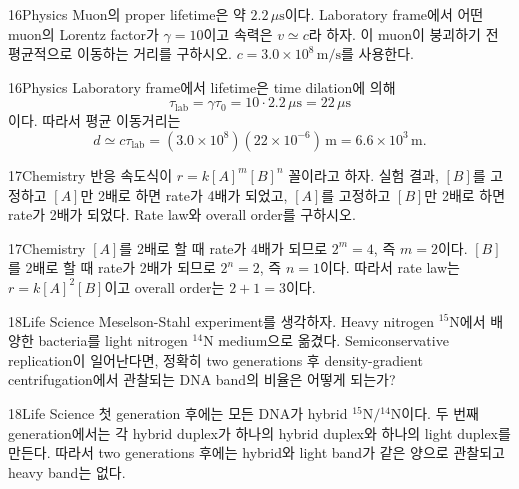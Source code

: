 \documentclass[12pt,aspectratio=169]{beamer}
\begin{document}
\begin{problemframe}{16}{Physics}
Muon의 proper lifetime은 약 $2.2\,\mu\mathrm{s}$이다. Laboratory frame에서 어떤 muon의 Lorentz factor가 $\gamma=10$이고 속력은 $v\simeq c$라 하자. 이 muon이 붕괴하기 전 평균적으로 이동하는 거리를 구하시오. $c=3.0\times10^8\,\mathrm{m/s}$를 사용한다.
\end{problemframe}

\begin{solutionframe}{16}{Physics}
Laboratory frame에서 lifetime은 time dilation에 의해
\[
\tau_{\mathrm{lab}}=\gamma\tau_0=10\cdot2.2\,\mu\mathrm{s}=22\,\mu\mathrm{s}
\]
이다. 따라서 평균 이동거리는
\[
d\simeq c\tau_{\mathrm{lab}}
=(3.0\times10^8)(22\times10^{-6})\,\mathrm{m}
=6.6\times10^3\,\mathrm{m}.
\]
\end{solutionframe}

\begin{problemframe}{17}{Chemistry}
반응 속도식이 $r=k[A]^m[B]^n$ 꼴이라고 하자. 실험 결과, $[B]$를 고정하고 $[A]$만 2배로 하면 rate가 4배가 되었고, $[A]$를 고정하고 $[B]$만 2배로 하면 rate가 2배가 되었다. Rate law와 overall order를 구하시오.
\end{problemframe}

\begin{solutionframe}{17}{Chemistry}
$[A]$를 2배로 할 때 rate가 4배가 되므로 $2^m=4$, 즉 $m=2$이다. $[B]$를 2배로 할 때 rate가 2배가 되므로 $2^n=2$, 즉 $n=1$이다. 따라서 rate law는 $r=k[A]^2[B]$이고 overall order는 $2+1=3$이다.
\end{solutionframe}

\begin{problemframe}{18}{Life Science}
Meselson-Stahl experiment를 생각하자. Heavy nitrogen $^{15}\mathrm N$에서 배양한 bacteria를 light nitrogen $^{14}\mathrm N$ medium으로 옮겼다. Semiconservative replication이 일어난다면, 정확히 two generations 후 density-gradient centrifugation에서 관찰되는 DNA band의 비율은 어떻게 되는가?
\end{problemframe}

\begin{solutionframe}{18}{Life Science}
첫 generation 후에는 모든 DNA가 hybrid $^{15}\mathrm N/{}^{14}\mathrm N$이다. 두 번째 generation에서는 각 hybrid duplex가 하나의 hybrid duplex와 하나의 light duplex를 만든다. 따라서 two generations 후에는 hybrid와 light band가 같은 양으로 관찰되고 heavy band는 없다.
\end{solutionframe}
\end{document}
